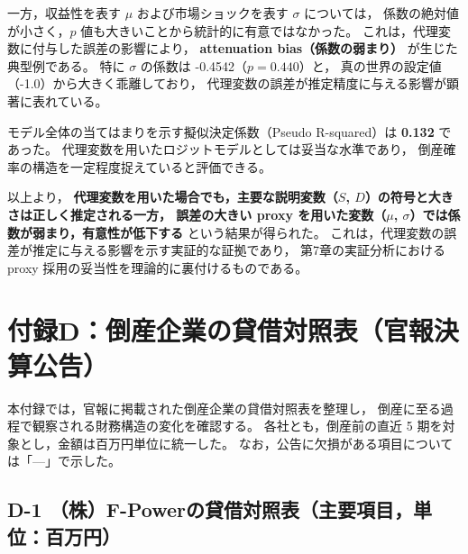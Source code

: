 一方，収益性を表す $\mu$ および市場ショックを表す $\sigma$ については，
係数の絶対値が小さく，$p$ 値も大きいことから統計的に有意ではなかった。
これは，代理変数に付与した誤差の影響により，
\textbf{attenuation bias（係数の弱まり）} が生じた典型例である。
特に $\sigma$ の係数は -0.4542（$p=0.440$）と，
真の世界の設定値（-1.0）から大きく乖離しており，
代理変数の誤差が推定精度に与える影響が顕著に表れている。

モデル全体の当てはまりを示す擬似決定係数（Pseudo R-squared）は \textbf{0.132} であった。
代理変数を用いたロジットモデルとしては妥当な水準であり，
倒産確率の構造を一定程度捉えていると評価できる。

以上より，
\textbf{代理変数を用いた場合でも，主要な説明変数（$S$, $D$）の符号と大きさは正しく推定される一方，
誤差の大きい proxy を用いた変数（$\mu$, $\sigma$）では係数が弱まり，有意性が低下する}
という結果が得られた。
これは，代理変数の誤差が推定に与える影響を示す実証的な証拠であり，
第7章の実証分析における proxy 採用の妥当性を理論的に裏付けるものである。


%


\chapter*{付録D：倒産企業の貸借対照表（官報決算公告）}

本付録では，官報に掲載された倒産企業の貸借対照表を整理し，
倒産に至る過程で観察される財務構造の変化を確認する。
各社とも，倒産前の直近 5 期を対象とし，金額は百万円単位に統一した。
なお，公告に欠損がある項目については「—」で示した。

\section*{D-1 （株）F-Powerの貸借対照表（主要項目，単位：百万円）}


